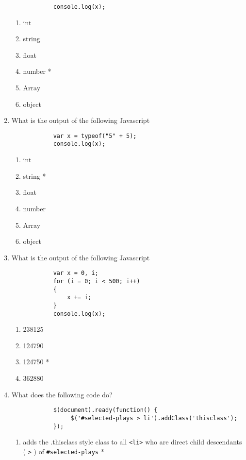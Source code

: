 \begin{enumerate}
\begin{verbatim}
            console.log(x);
        \end{verbatim}
        \begin{enumerate}
            \item int
            \item string
            \item float
            \item number *
            \item Array
            \item object
        \end{enumerate}
    \item What is the output of the following Javascript
        \begin{verbatim}
            var x = typeof("5" + 5);
            console.log(x);
        \end{verbatim}
        \begin{enumerate}
            \item int
            \item string *
            \item float
            \item number
            \item Array
            \item object
        \end{enumerate}
    \item What is the output of the following Javascript
        \begin{verbatim}
            var x = 0, i;
            for (i = 0; i < 500; i++)
            { 
                x += i; 
            }
            console.log(x);
        \end{verbatim}
        \begin{enumerate}
            \item 238125
            \item 124790
            \item 124750 *
            \item 362880
        \end{enumerate}
    \item What does the following code do?
        \begin{verbatim}
            $(document).ready(function() {
                 $('#selected-plays > li').addClass('thisclass');
            });
        \end{verbatim}
        \begin{enumerate}
            \item adds the .thisclass style class to all \texttt{<li>} who are direct child descendants ( \texttt{>} ) of \texttt{\#selected-plays} *

\end{enumerate}
\end{enumerate}
